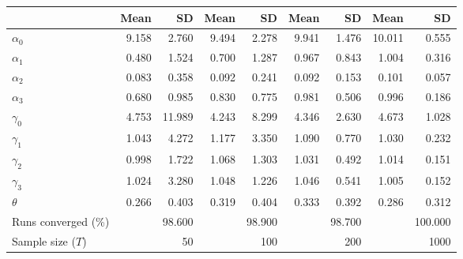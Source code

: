 
\begin{tabular}[t]{lrrrrrrrr}
\toprule
  & Mean & SD & Mean  & SD  & Mean   & SD   & Mean    & SD   \\
\midrule
$\alpha_{0}$ & 9.158 & 2.760 & 9.494 & 2.278 & 9.941 & 1.476 & 10.011 & 0.555\\
$\alpha_{1}$ & 0.480 & 1.524 & 0.700 & 1.287 & 0.967 & 0.843 & 1.004 & 0.316\\
$\alpha_{2}$ & 0.083 & 0.358 & 0.092 & 0.241 & 0.092 & 0.153 & 0.101 & 0.057\\
$\alpha_{3}$ & 0.680 & 0.985 & 0.830 & 0.775 & 0.981 & 0.506 & 0.996 & 0.186\\
$\gamma_{0}$ & 4.753 & 11.989 & 4.243 & 8.299 & 4.346 & 2.630 & 4.673 & 1.028\\
$\gamma_{1}$ & 1.043 & 4.272 & 1.177 & 3.350 & 1.090 & 0.770 & 1.030 & 0.232\\
$\gamma_{2}$ & 0.998 & 1.722 & 1.068 & 1.303 & 1.031 & 0.492 & 1.014 & 0.151\\
$\gamma_{3}$ & 1.024 & 3.280 & 1.048 & 1.226 & 1.046 & 0.541 & 1.005 & 0.152\\
$\theta$ & 0.266 & 0.403 & 0.319 & 0.404 & 0.333 & 0.392 & 0.286 & 0.312\\
Runs converged (\%) &  & 98.600 &  & 98.900 &  & 98.700 &  & 100.000\\
Sample size ($T$) &  & 50 &  & 100 &  & 200 &  & 1000\\
\bottomrule
\end{tabular}

